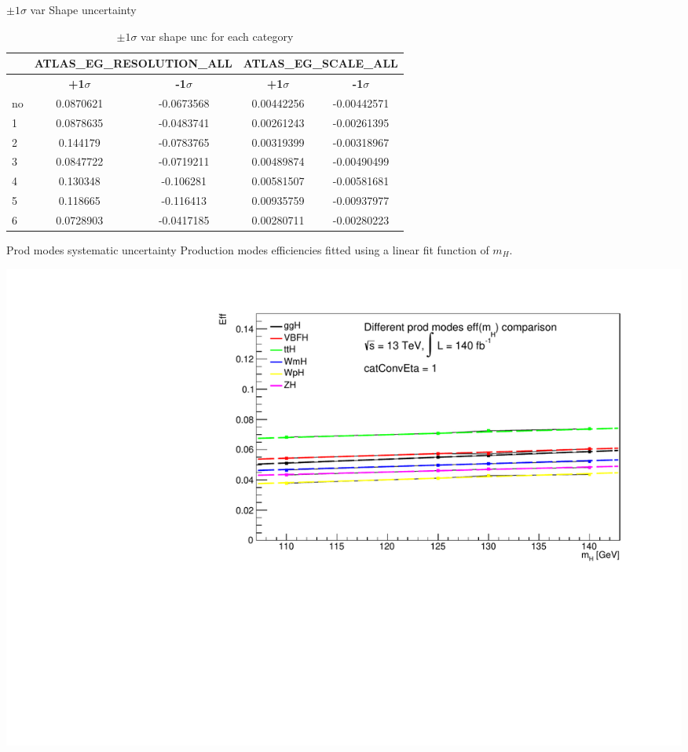 \documentclass[10pt,UKenglish, leqno, xcolor = dvipsnames]{beamer}
\begin{document}
	\begin{frame}{$\pm1\sigma$ var Shape uncertainty}
		\vfill
		\centering
		\begin{table}[tbp]
			\centering
			\begin{tabular}{lcccc}
				\toprule[1.5pt]
				& \multicolumn{2}{c}{ATLAS\_EG\_RESOLUTION\_ALL}	
				& \multicolumn{2}{c}{ATLAS\_EG\_SCALE\_ALL}\\
				\midrule
				& \textbf{+1$\sigma$} & \textbf{-1$\sigma$}
				& \textbf{+1$\sigma$} & \textbf{-1$\sigma$}\\
				\cmidrule(lr){2-3} \cmidrule(lr){4-5}
				no& 0.0870621 & -0.0673568  & 0.00442256 & -0.00442571 \\
				1 & 0.0878635 & -0.0483741 	& 0.00261243 & -0.00261395 \\
				2 & 0.144179  & -0.0783765 	& 0.00319399 & -0.00318967 \\
				3 & 0.0847722 & -0.0719211  & 0.00489874 & -0.00490499 \\
				4 & 0.130348  & -0.106281   & 0.00581507 & -0.00581681 \\
				5 & 0.118665  & -0.116413   & 0.00935759 & -0.00937977 \\
				6 & 0.0728903 & -0.0417185  & 0.00280711 & -0.00280223 \\
				\bottomrule[1.5pt]
			\end{tabular}
			\caption{$\pm1\sigma$ var shape unc for each category}
		\end{table}
		\vfill
	\end{frame}

	\begin{frame}{Prod modes systematic uncertainty}
		\vfill
		Production modes efficiencies fitted using a linear fit function of $m_H$.
		\begin{center}
			\includegraphics[width=.8\textwidth]{Pres_Images/Signal/eff_all_prod_cat_1.pdf}
		\end{center}
		\vfill
	\end{frame}
\end{document}
